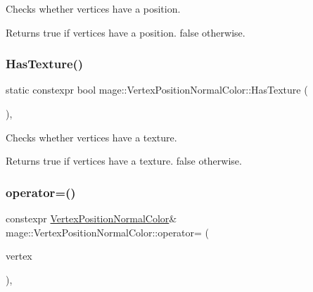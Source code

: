 Checks whether vertices have a position.

\begin{DoxyReturn}{Returns}
{\ttfamily true} if vertices have a position. {\ttfamily false} otherwise. 
\end{DoxyReturn}
\hypertarget{structmage_1_1_vertex_position_normal_color_a9939ce4300e6dd0402abd299f55435ef}{}\label{structmage_1_1_vertex_position_normal_color_a9939ce4300e6dd0402abd299f55435ef} 
\subsubsection{\texorpdfstring{Has\+Texture()}{HasTexture()}}
{\footnotesize\ttfamily static constexpr bool mage\+::\+Vertex\+Position\+Normal\+Color\+::\+Has\+Texture (\begin{DoxyParamCaption}{ }\end{DoxyParamCaption})\hspace{0.3cm}{\ttfamily [static]}, {\ttfamily [noexcept]}}

Checks whether vertices have a texture.

\begin{DoxyReturn}{Returns}
{\ttfamily true} if vertices have a texture. {\ttfamily false} otherwise. 
\end{DoxyReturn}
\hypertarget{structmage_1_1_vertex_position_normal_color_aa2af425d22686e8d7eac31b88eb00792}{}\label{structmage_1_1_vertex_position_normal_color_aa2af425d22686e8d7eac31b88eb00792} 
\subsubsection{\texorpdfstring{operator=()}{operator=()}\hspace{0.1cm}{\footnotesize\ttfamily [1/2]}}
{\footnotesize\ttfamily constexpr \hyperlink{structmage_1_1_vertex_position_normal_color}{Vertex\+Position\+Normal\+Color}\& mage\+::\+Vertex\+Position\+Normal\+Color\+::operator= (\begin{DoxyParamCaption}\item[{const \hyperlink{structmage_1_1_vertex_position_normal_color}{Vertex\+Position\+Normal\+Color} \&}]{vertex }\end{DoxyParamCaption})\hspace{0.3cm}{\ttfamily [default]}, {\ttfamily [noexcept]}}


